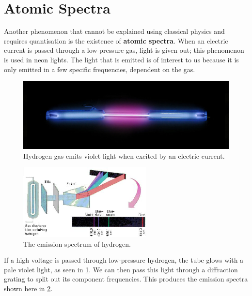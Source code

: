 \documentclass[a4paper]{amsbook}
\theoremstyle{definition}
\numberwithin{exercise}{chapter}
\numberwithin{exercise}{chapter}
\begin{document}
\section{Atomic Spectra}
Another phenomenon that cannot be explained using classical physics and requires quantisation is the existence of \textbf{atomic spectra}.
When an electric current is passed through a low-pressure gas, light is given out; this phenomenon is used in neon lights. The light that
is emitted is of interest to us because it is only emitted in a few specific frequencies, dependent on the gas.

\begin{figure}
  \centering
  \includegraphics[width=\textwidth]{hydrogen-light}
  \caption{Hydrogen gas emits violet light when excited by an electric current. \label{fig:neonlight}}
\end{figure}
\begin{figure}
  \centering
  \includegraphics[width=0.6\textwidth]{hydrogen1}
  \caption{The emission spectrum of hydrogen. \label{fig:hydrogen1}}
\end{figure}

If a high voltage is passed through low-pressure hydrogen, the tube glows with a pale violet light, as seen in \cref{fig:neonlight}. We can
then pass this light through a diffraction grating to split out its component frequencies. This produces the emission spectra shown here in \cref{fig:hydrogen1}.
\end{document}
